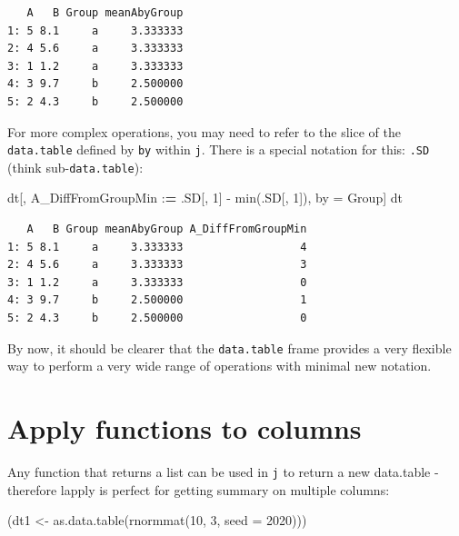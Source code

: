 \documentclass[
]{book}
\makeatletter
\newenvironment{Shaded}{\begin{snugshade}}{\end{snugshade}}
\newcommand{\AttributeTok}[1]{\textcolor[rgb]{0.77,0.63,0.00}{#1}}
\newcommand{\DecValTok}[1]{\textcolor[rgb]{0.00,0.00,0.81}{#1}}
\newcommand{\ErrorTok}[1]{\textcolor[rgb]{0.64,0.00,0.00}{\textbf{#1}}}
\newcommand{\FunctionTok}[1]{\textcolor[rgb]{0.00,0.00,0.00}{#1}}
\newcommand{\NormalTok}[1]{#1}
\newcommand{\OtherTok}[1]{\textcolor[rgb]{0.56,0.35,0.01}{#1}}
\newcommand{\SpecialCharTok}[1]{\textcolor[rgb]{0.00,0.00,0.00}{#1}}
\newenvironment{kframe}{%
\medskip{}
\setlength{\fboxsep}{.8em}
 \def\at@end@of@kframe{}%
 \ifinner\ifhmode%
  \def\at@end@of@kframe{\end{minipage}}%
  \begin{minipage}{\columnwidth}%
 \fi\fi%
 \def\FrameCommand##1{\hskip\@totalleftmargin \hskip-\fboxsep
 \colorbox{shadecolor}{##1}\hskip-\fboxsep
     \hskip-\linewidth \hskip-\@totalleftmargin \hskip\columnwidth}%
 \MakeFramed {\advance\hsize-\width
   \@totalleftmargin\z@ \linewidth\hsize
   \@setminipage}}%
 {\par\unskip\endMakeFramed%
 \at@end@of@kframe}
\newenvironment{rmdblock}[1]
  {
  \begin{itemize}
  \renewcommand{\labelitemi}{
    \raisebox{-.7\height}[0pt][0pt]{
      {\setkeys{Gin}{width=3em,keepaspectratio}\texttt{[image: images/\#1]}}
    }
  }
  \setlength{\fboxsep}{1em}
  \begin{kframe}
  \item
  }
  {
  \end{kframe}
  \end{itemize}
  }
\newenvironment{note}
  {\begin{rmdblock}{note}}
  {\end{rmdblock}}
\makeatother
\begin{document}
\begin{verbatim}
   A   B Group meanAbyGroup
1: 5 8.1     a     3.333333
2: 4 5.6     a     3.333333
3: 1 1.2     a     3.333333
4: 3 9.7     b     2.500000
5: 2 4.3     b     2.500000
\end{verbatim}

For more complex operations, you may need to refer to the slice of the \texttt{data.table} defined by \texttt{by} within \texttt{j}. There is a special notation for this: \texttt{.SD} (think sub-\texttt{data.table}):

\begin{Shaded}
\begin{Highlighting}[]
\NormalTok{dt[, A\_DiffFromGroupMin }\SpecialCharTok{:}\ErrorTok{=}\NormalTok{ .SD[, }\DecValTok{1}\NormalTok{] }\SpecialCharTok{{-}} \FunctionTok{min}\NormalTok{(.SD[, }\DecValTok{1}\NormalTok{]), by }\OtherTok{=}\NormalTok{ Group]}
\NormalTok{dt}
\end{Highlighting}
\end{Shaded}

\begin{verbatim}
   A   B Group meanAbyGroup A_DiffFromGroupMin
1: 5 8.1     a     3.333333                  4
2: 4 5.6     a     3.333333                  3
3: 1 1.2     a     3.333333                  0
4: 3 9.7     b     2.500000                  1
5: 2 4.3     b     2.500000                  0
\end{verbatim}

\begin{note}
By now, it should be clearer that the \texttt{data.table} frame provides
a very flexible way to perform a very wide range of operations with
minimal new notation.
\end{note}

\hypertarget{apply-functions-to-columns}{%
\section{Apply functions to columns}\label{apply-functions-to-columns}}

Any function that returns a list can be used in \texttt{j} to return a new data.table - therefore lapply is perfect for getting summary on multiple columns:

\begin{Shaded}
\begin{Highlighting}[]
\NormalTok{(dt1 }\OtherTok{\textless{}{-}} \FunctionTok{as.data.table}\NormalTok{(}\FunctionTok{rnormmat}\NormalTok{(}\DecValTok{10}\NormalTok{, }\DecValTok{3}\NormalTok{, }\AttributeTok{seed =} \DecValTok{2020}\NormalTok{)))}
\end{Highlighting}
\end{Shaded}
\end{document}
